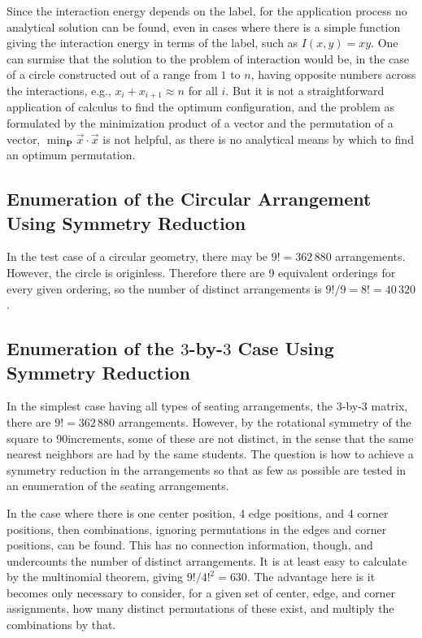 \documentclass{article}
\begin{document}
Since the interaction energy depends on the label, for the application process no analytical solution can be found, even in cases where there is a simple function giving the interaction energy in terms of the label, such as $I(x,y) = xy$. One can surmise that the solution to the problem of interaction would be, in the case of a circle constructed out of a range from $1$ to $n$, having opposite numbers across the interactions, e.g., $x_i + x_{i+1} \approx n$ for all $i$. But it is not a straightforward application of calculus to find the optimum configuration, and the problem as formulated by the minimization product of a vector and the permutation of a vector, $\min_{\mathbf{P}} \vec x \cdot \vec x$ is not helpful, as there is no analytical means by which to find an optimum permutation.

\subsection{Enumeration of the Circular Arrangement Using Symmetry Reduction}
In the test case of a circular geometry, there may be $9! = 362\,880$ arrangements. However, the circle is originless. Therefore there are 9 equivalent orderings for every given ordering, so the number of distinct arrangements is $9!/9 = 8! = 40\,320$.

\subsection{Enumeration of the $3$-by-$3$ Case Using Symmetry Reduction}
In the simplest case having all types of seating arrangements, the $3$-by-$3$ matrix, there are $9! = 362\,880$ arrangements. However, by the rotational symmetry of the square to 90\degree increments, some of these are not distinct, in the sense that the same nearest neighbors are had by the same students. The question is how to achieve a symmetry reduction in the arrangements so that as few as possible are tested in an enumeration of the seating arrangements.

In the case where there is one center position, 4 edge positions, and 4 corner positions, then combinations, ignoring permutations in the edges and corner positions, can be found. This has no connection information, though, and undercounts the number of distinct arrangements. It is at least easy to calculate by the multinomial theorem, giving $9!/4!^2 = 630$. The advantage here is it becomes only necessary to consider, for a given set of center, edge, and corner assignments, how many distinct permutations of these exist, and multiply the combinations by that.
\end{document}
